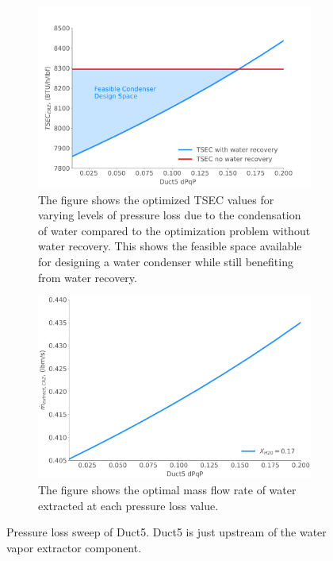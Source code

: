 \documentclass[conf]{new-aiaa}
\begin{document}
\begin{figure}[hbt!]
    \centering
    \begin{subfigure}[t]{0.48\textwidth}
        \includegraphics[width=\textwidth]{N3_dpqp.pdf}
        \caption{
            The figure shows the optimized TSEC values for varying levels of pressure loss due to the condensation of water compared to the optimization problem without water recovery.
            This shows the feasible space available for designing a water condenser while still benefiting from water recovery.}
        \label{fig:dpqp_sweep}
    \end{subfigure}
    \hspace{2pt}
    \begin{subfigure}[t]{0.48\textwidth}
        \includegraphics[width=\textwidth]{N3_wdot.pdf}
        \caption{
            The figure shows the optimal mass flow rate of water extracted at each pressure loss value.
        }
        \label{fig:dpqp_wdot}
    \end{subfigure}
    \caption{Pressure loss sweep of Duct5.
        Duct5 is just upstream of the water vapor extractor component.}
    \label{fig:dpqp_study}
\end{figure}
\end{document}
